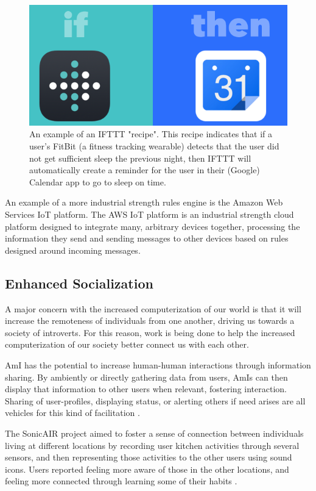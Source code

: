 \documentclass{article}
\begin{document}
\begin{figure}
  \begin{center}
    \includegraphics[width=.6\linewidth]{ifttt_recipe}
  \end{center}
  \caption{An example of an IFTTT "recipe". This recipe indicates that if a user's FitBit (a fitness tracking wearable) detects that the user did not get sufficient sleep the previous night, then IFTTT will automatically create a reminder for the user in their (Google) Calendar app to go to sleep on time. \cite{ifttt}}
  \label{ifttt_recipe}
\end{figure}

An example of a more industrial strength rules engine is the Amazon Web Services IoT platform. The AWS IoT platform is an industrial strength cloud platform designed to integrate many, arbitrary devices together, processing the information they send and sending messages to other devices based on rules designed around incoming messages. \cite{awsiot}


\subsection{Enhanced Socialization}
A major concern with the increased computerization of our world is that it will increase the remoteness of individuals from one another, driving us towards a society of introverts. For this reason, work is being done to help the increased computerization of our society better connect us with each other.

AmI has the potential to increase human-human interactions through information sharing. By ambiently or directly gathering data from users, AmIs can then display that information to other users when relevant, fostering interaction. Sharing of user-profiles, displaying status, or alerting others if need arises are all vehicles for this kind of facilitation \cite{Sadri:2011:AIS:1978802.1978815}.

The SonicAIR project aimed to foster a sense of connection between individuals living at different locations by recording user kitchen activities through several sensors, and then representing those activities to the other users using sound icons. Users reported feeling more aware of those in the other locations, and feeling more connected through learning some of their habits \cite{Baharin:2015:SSI:2798442.2754165}.
\end{document}
